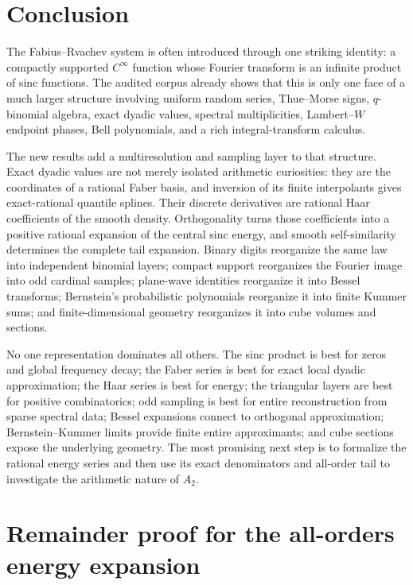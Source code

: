\documentclass[11pt]{article}
\theoremstyle{definition}
\theoremstyle{remark}
\begin{document}
\section{Conclusion}
\label{p8:sec:conclusion}

The Fabius--Rvachev system is often introduced through one striking identity:
a compactly supported $C^\infty$ function whose Fourier transform is an
infinite product of sinc functions.  The audited corpus already shows that
this is only one face of a much larger structure involving uniform random
series, Thue--Morse signs, $q$-binomial algebra, exact dyadic values, spectral
multiplicities, Lambert--$W$ endpoint phases, Bell polynomials, and a rich
integral-transform calculus.

The new results add a multiresolution and sampling layer to that structure.
Exact dyadic values are not merely isolated arithmetic curiosities: they are
the coordinates of a rational Faber basis, and inversion of its finite
interpolants gives exact-rational quantile splines.  Their discrete derivatives are
rational Haar coefficients of the smooth density.  Orthogonality turns those
coefficients into a positive rational expansion of the central sinc energy,
and smooth self-similarity determines the complete tail expansion.  Binary
digits reorganize the same law into independent binomial layers; compact
support reorganizes the Fourier image into odd cardinal samples; plane-wave
identities reorganize it into Bessel transforms; Bernstein's probabilistic
polynomials reorganize it into finite Kummer sums; and finite-dimensional
geometry reorganizes it into cube volumes and sections.

No one representation dominates all others.  The sinc product is best for
zeros and global frequency decay; the Faber series is best for exact local
dyadic approximation; the Haar series is best for energy; the triangular
layers are best for positive combinatorics; odd sampling is best for entire
reconstruction from sparse spectral data; Bessel expansions connect to
orthogonal approximation; Bernstein--Kummer limits provide finite entire
approximants; and cube sections expose the underlying geometry.  The most
promising next step is to formalize the rational energy series and then use
its exact denominators and all-order tail to investigate the arithmetic nature
of $A_2$.

\appendix

\section{Remainder proof for the all-orders energy expansion}
\label{p8:app:energy-proof}
\end{document}
